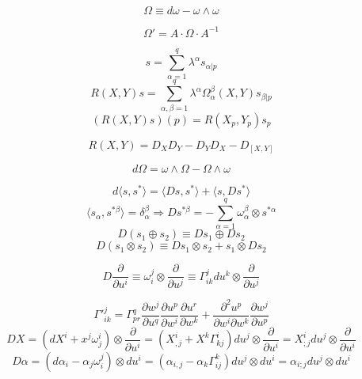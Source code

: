 \begin{newdef}
\[\Omega \equiv d\omega - \omega \wedge \omega\]
\end{newdef}

\begin{newprop}
\[\Omega' = A \cdot \Omega \cdot A^{-1}\]
\end{newprop}

\begin{newdef}
\[s = \sum_{\alpha=1}^{q} \lambda^{\alpha} s_{\alpha|p}\]
\[R(X,Y)s = \sum_{\alpha,\beta=1}^{q} \lambda^{\alpha} \Omega^{\beta}_{\alpha}(X,Y)s_{\beta|p}\]
\[(R(X,Y)s)(p) = R(X_p,Y_p)s_p\]
\end{newdef}

\begin{newprop}
\[R(X,Y) = D_X D_Y - D_Y D_X -D_{[X,Y]}\]
\end{newprop}

\begin{newthem}
\[d\Omega = \omega \wedge \Omega - \Omega \wedge \omega\]
\end{newthem}

\begin{newdef}
\[d\langle s,s^* \rangle = \langle Ds,s^* \rangle + \langle s,Ds^* \rangle\]
\[\langle s_{\alpha},s^{*\beta} \rangle  = \delta^{\beta}_{\alpha}  \Rightarrow Ds^{*\beta} = -\sum_{\alpha=1}^{q} \omega^{\beta}_{\alpha} \otimes s^{*\alpha}\]
\[D(s_1 \oplus s_2) \equiv Ds_1 \oplus Ds_2\]
\[D(s_1 \otimes s_2) \equiv Ds_1 \otimes s_2 + s_1 \otimes Ds_2\]
\end{newdef}

\begin{newdef}
\[D\frac{\partial}{\partial u^i} \equiv \omega^j_i \otimes \frac{\partial}{\partial u^j} \equiv \Gamma^{j}_{ik} du^k \otimes \frac{\partial}{\partial u^j}\]
\end{newdef}

\begin{newprop}
\[\Gamma'^{j}_{ik} = \Gamma^{q}_{pr} \frac{\partial w^j}{\partial u^q} \frac{\partial u^p}{\partial w^i} \frac{\partial u^r}{\partial w^k} + \frac{\partial^2 u^p}{\partial w^i \partial w^k} \frac{\partial w^j}{\partial u^p}\]
\[DX = (dX^i + x^j \omega^i_j)\otimes \frac{\partial}{\partial u^i} = (X^i_{,j} + X^k \Gamma^{i}_{kj}) du^j \otimes \frac{\partial}{\partial u^i} = X^i_{;j}du^j \otimes \frac{\partial}{\partial u^i} \]
\[D \alpha = (d\alpha_i - \alpha_j \omega^j_i)\otimes du^i = (\alpha_{i,j} -\alpha_k \Gamma^k_{ij})du^j \otimes du^i = \alpha_{i;j} du^j \otimes du^i \]
\end{newprop}

